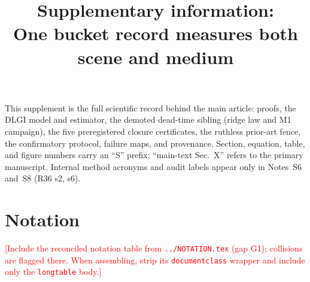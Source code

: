 \documentclass[10pt]{article}
\title{Supplementary information:\\
One bucket record measures both scene and medium}
\author{\SPH{author block --- USER DECISION (mirrors main text, gap G7)}}
\date{}
\newcommand{\SPH}[1]{\textcolor{red}{[#1]}}
\begin{document}
\maketitle

\noindent
This supplement is the full scientific record behind the main article: proofs,
the DLGI model and estimator, the demoted dead-time sibling (ridge law and M1
campaign), the five preregistered closure certificates, the ruthless prior-art
fence, the confirmatory protocol, failure maps, and provenance. Section,
equation, table, and figure numbers carry an ``S'' prefix; ``main-text Sec.~X''
refers to the primary manuscript. Internal method acronyms and audit labels
appear only in Notes~S6 and~S8 (R36 s2, s6).

\section*{Notation}
\SPH{Include the reconciled notation table from \texttt{../NOTATION.tex} (gap G1);
collisions are flagged there. When assembling, strip its \texttt{documentclass}
wrapper and include only the \texttt{longtable} body.}












% 
\end{document}
